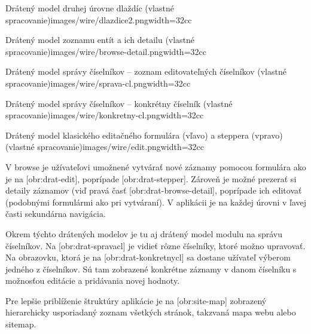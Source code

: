 {Drátený model druhej úrovne dlaždíc (vlastné spracovanie)}{images/wire/dlazdice2.png}{width=32cc}

{Drátený model zoznamu entít a ich detailu (vlastné spracovanie)}{images/wire/browse-detail.png}{width=32cc}

{Drátený model správy číselníkov -- zoznam editovateľných číselníkov (vlastné spracovanie)}{images/wire/sprava-cl.png}{width=32cc}

{Drátený model správy číselníkov -- konkrétny číselník (vlastné spracovanie)}{images/wire/konkretny-cl.png}{width=32cc}

{Drátený model klasického editačného formulára (vľavo) a steppera (vpravo) (vlastné spracovanie)}{images/wire/edit.png}{width=32cc}


%

%
%

V browse je užívateľovi umožnené vytvárať nové záznamy pomocou formulára ako je na [obr:drat-edit], poprípade [obr:drat-stepper]. Zároveň je možné prezerať si detaily záznamov (viď pravá časť [obr:drat-browse-detail], poprípade ich editovať (podobnými formulármi ako pri vytváraní). V aplikácii je na každej úrovni v ľavej časti sekundárna navigácia.

Okrem týchto drátených modelov je tu aj drátený model modulu na správu číselníkov. Na [obr:drat-spravacl] je vidieť rôzne číselníky, ktoré možno upravovať. Na obrazovku, ktorá je na [obr:drat-konkretnycl] sa dostane užívateľ výberom jedného z číselníkov. Sú tam zobrazené konkrétne záznamy v danom číselníku s možnosťou editácie a pridávania novej hodnoty.

Pre lepšie priblíženie štruktúry aplikácie je na [obr:site-map] zobrazený hierarchicky usporiadaný zoznam všetkých stránok, takzvaná mapa webu alebo sitemap.

